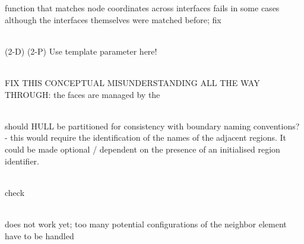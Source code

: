 \begin{DoxyRefList}
function that matches node coordinates across interfaces fails in some cases although the interfaces themselves were matched before; fix  
\item[Member \doxylink{classcsmp_1_1_arithmetic_mean_a5b1bb561e709258702a02bfc800601f5}{csmp\+::Arithmetic\+Mean\texorpdfstring{$<$}{<} dim, var \texorpdfstring{$>$}{>}\+::Arithmetic\+Mean} (const \doxylink{classcsmp_1_1_property_database}{Property\+Database$<$ dim $>$} \&p, const char \texorpdfstring{$\ast$}{*}res\+\_\+prop, const char \texorpdfstring{$\ast$}{*}prop\+\_\+to\+\_\+avg)]\hfill \\
\label{todo__todo000190}%
%
(2-\/D) (2-\/P) Use template parameter here!  
\item[Member \doxylink{classcsmp_1_1_boundary_a1796d66b97f58b8901989a0284aa714c}{csmp\+::Boundary\texorpdfstring{$<$}{<} dim \texorpdfstring{$>$}{>}\+::\texorpdfstring{$\sim$}{\string~}\+Boundary} ()]\hfill \\
\label{todo__todo000137}%
%
FIX THIS CONCEPTUAL MISUNDERSTANDING ALL THE WAY THROUGH\+: the faces are managed by the   
\item[Member \doxylink{classcsmp_1_1_boundary_interface_ad24b7f5db1277b6a7837a700d103d153}{csmp\+::Boundary\+Interface\texorpdfstring{$<$}{<} dim, BOUNDARY\+\_\+\+COMPLEX \texorpdfstring{$>$}{>}\+::Create\+Boundary\+Around} (const char \texorpdfstring{$\ast$}{*}region)]\hfill \\
\label{todo__todo000139}%
%
should HULL be partitioned for consistency with boundary naming conventions? -\/ this would require the identification of the names of the adjacent regions. It could be made optional / dependent on the presence of an initialised region identifier. 
\item[Member \doxylink{classcsmp_1_1_boundary_interface_a4e8a32b74b875851b1805944812b3a70}{csmp\+::Boundary\+Interface\texorpdfstring{$<$}{<} dim, BOUNDARY\+\_\+\+COMPLEX \texorpdfstring{$>$}{>}\+::Create\+Boundary\+Between} (const char \texorpdfstring{$\ast$}{*}region1, const char \texorpdfstring{$\ast$}{*}region2)]\hfill \\
\label{todo__todo000138}%
%
check 
\item[Member \doxylink{namespacecsmp_a67caba1878a6a99f8fc3f11f43b6f400}{csmp\+::bounding\+Box} (const \doxylink{classcsmp_1_1_v_data}{VData} \&, size\+\_\+t elmt)]\hfill \\
\label{todo__todo000083}%
%
does not work yet; too many potential configurations of the neighbor element have to be handled


\end{DoxyRefList}

